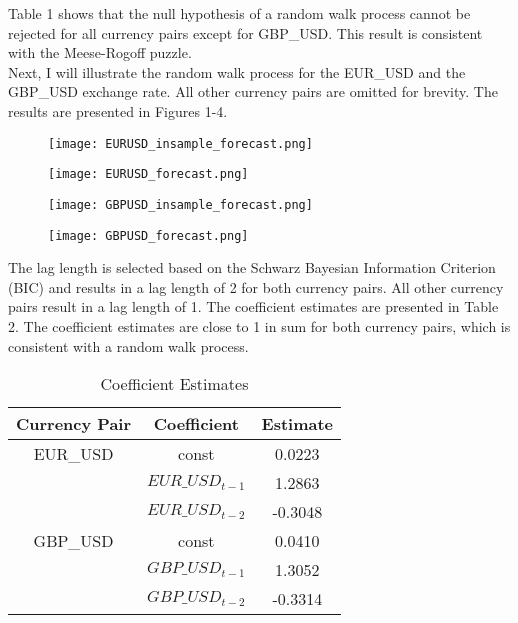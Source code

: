 \documentclass{article}
\begin{document}
Table 1 shows that the null hypothesis of a random walk process cannot be rejected for all currency pairs except for GBP\_USD. This result is consistent with the Meese-Rogoff puzzle.\\

Next, I will illustrate the random walk process for the EUR\_USD and the GBP\_USD exchange rate. All other currency pairs are omitted for brevity. The results are presented in Figures 1-4.

\begin{figure}[H]
    \centering
    \texttt{[image: EURUSD\_insample\_forecast.png]}
\end{figure}
\begin{figure}[H]
    \centering
    \texttt{[image: EURUSD\_forecast.png]}
\end{figure}
\begin{figure}[H]
    \centering
    \texttt{[image: GBPUSD\_insample\_forecast.png]}
\end{figure}
\begin{figure}[H]
    \centering
    \texttt{[image: GBPUSD\_forecast.png]}
\end{figure}

The lag length is selected based on the Schwarz Bayesian Information Criterion (BIC) and results in a lag length of 2 for both currency pairs. 
All other currency pairs result in a lag length of 1. The coefficient estimates are presented in Table 2. The coefficient estimates are close to 1 in sum for both currency pairs, which is consistent with a random walk process.\\
\begin{table}[H]
    \centering
    \caption{Coefficient Estimates}
    \begin{tabular}{ccc}
        \hline
        Currency Pair & Coefficient & Estimate \\
        \hline
        EUR\_USD & const & 0.0223 \\
        & $EUR\_USD_{t-1}$ & 1.2863 \\
        & $EUR\_USD_{t-2}$ & -0.3048 \\
        \hline
        GBP\_USD & const & 0.0410 \\
        & $GBP\_USD_{t-1}$ & 1.3052 \\
        & $GBP\_USD_{t-2}$ & -0.3314 \\
        \hline
    \end{tabular}
\end{table}
\end{document}
